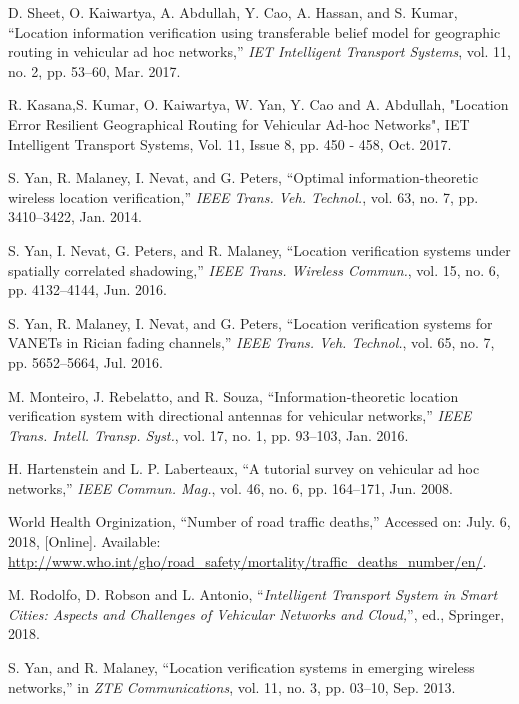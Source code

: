 \documentclass[journal]{IEEEtran}
\begin{document}
\begin{thebibliography}{1}

 D. Sheet, O. Kaiwartya, A. Abdullah, Y. Cao, A. Hassan, and S. Kumar, ``Location information verification using transferable belief model for geographic routing in vehicular ad hoc networks,'' \textit{IET Intelligent Transport Systems}, vol. 11, no. 2, pp. 53--60, Mar. 2017.

 R. Kasana,S. Kumar, O. Kaiwartya, W. Yan, Y. Cao and A. Abdullah, "Location Error Resilient Geographical Routing for Vehicular Ad-hoc Networks", IET Intelligent Transport Systems, Vol. 11, Issue 8, pp. 450 - 458, Oct. 2017.

 S. Yan, R. Malaney, I. Nevat, and G. Peters, ``Optimal information-theoretic wireless location verification,'' \textit{IEEE Trans. Veh. Technol.}, vol. 63, no. 7, pp. 3410--3422, Jan. 2014.

 S. Yan, I. Nevat, G. Peters, and R. Malaney, ``Location verification systems under spatially correlated shadowing,'' \textit{IEEE Trans. Wireless Commun.}, vol. 15, no.  6, pp. 4132--4144, Jun. 2016.

 S. Yan, R. Malaney, I. Nevat, and G. Peters, ``Location verification systems for VANETs in Rician fading channels,'' \textit{IEEE Trans. Veh. Technol.}, vol. 65, no. 7, pp. 5652--5664, Jul. 2016.

 M. Monteiro, J. Rebelatto, and R. Souza, ``Information-theoretic location verification system with directional antennas for vehicular networks,'' \textit{IEEE Trans. Intell. Transp. Syst.}, vol. 17, no. 1, pp. 93--103, Jan. 2016.

 H. Hartenstein and L. P. Laberteaux, ``A tutorial survey on vehicular ad hoc networks,'' \textit{IEEE Commun. Mag.}, vol. 46, no. 6, pp. 164--171, Jun. 2008.

 World Health Orginization, ``Number of road traffic deaths,'' Accessed on: July. 6, 2018, [Online]. Available: \underline{http://www.who.int/gho/road\_safety/mortality/traffic\_deaths\_number/en/}.

 M. Rodolfo, D. Robson and L. Antonio, ``\textit{Intelligent Transport System in Smart Cities: Aspects and Challenges of Vehicular Networks and Cloud,}'',  ed., Springer, 2018.

 S. Yan, and R. Malaney, ``Location verification systems in emerging wireless networks,'' in \textit{ZTE Communications}, vol. 11, no. 3, pp. 03--10, Sep. 2013.


\end{thebibliography}
\end{document}
